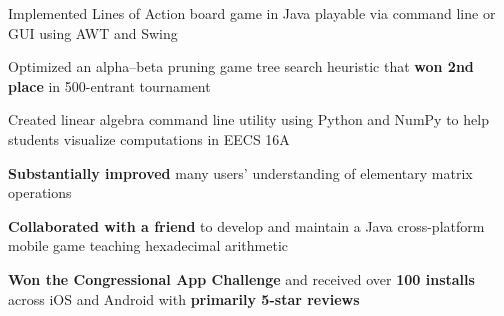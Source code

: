 \documentclass[]{deedy-resume-openfont}
\begin{document}
\begin{minipage}[t]{0.66\textwidth}
\begin{tightemize}
\item Implemented Lines of Action board game in Java playable via command line or GUI using AWT and Swing
\item Optimized an alpha–beta pruning game tree search heuristic that \textbf{won 2nd place} in 500-entrant tournament
\end{tightemize}
\sectionsep

\begin{tightemize}
\item Created linear algebra command line utility using Python and NumPy to help students visualize computations in EECS 16A
\item \textbf{Substantially improved} many users' understanding of elementary matrix operations
\end{tightemize}
\sectionsep

\begin{tightemize}
\item \textbf{Collaborated with a friend} to develop and maintain a Java cross-platform mobile game teaching hexadecimal arithmetic
\item \textbf{Won the Congressional App Challenge} and received over \textbf{100 installs} across iOS and Android with \textbf{primarily 5-star reviews}
\end{tightemize}
\sectionsep

\end{minipage} 
\end{document}
